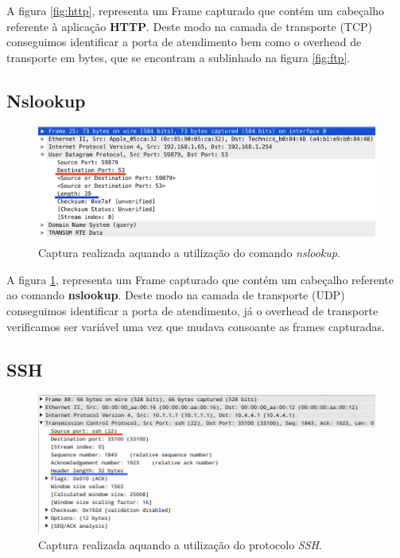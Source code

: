 \documentclass{llncs}
\begin{document}
A figura \ref{fig:http}, representa um Frame capturado que contém um cabeçalho referente à aplicação \textbf{HTTP}. Deste modo na camada de transporte (TCP) conseguimos identificar a porta de atendimento bem como o overhead de transporte em bytes, que se encontram a sublinhado na figura \ref{fig:ftp}.


\subsection{Nslookup}

\begin{figure}[H]
\begin{center}
\includegraphics[scale=0.4]{nslookup.png}
\end{center}
\caption{\label{fig:nslook}Captura realizada aquando a utilização do comando \emph{nslookup}.}
\end{figure}

A figura \ref{fig:nslook}, representa um Frame capturado que contém um cabeçalho referente ao comando \textbf{nslookup}. Deste modo na camada de transporte (UDP) conseguimos identificar a porta de atendimento, já o overhead de transporte verificamos ser variável uma vez que mudava consoante as frames capturadas.



\subsection{SSH}

\begin{figure}[H]
\begin{center}
\includegraphics[scale=0.4]{ssh.png}
\end{center}
\caption{\label{fig:ssh}Captura realizada aquando a utilização do protocolo \emph{SSH}.}
\end{figure}
\end{document}
